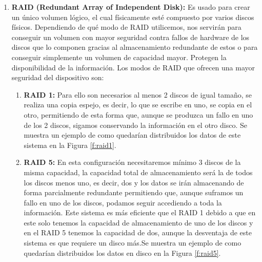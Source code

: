 \begin{enumerate}
\item {\bfseries RAID (Redundant Array of Independent Disk):}
Es usado para crear un único volumen lógico, el cual físicamente esté compuesto por varios discos físicos. Dependiendo de qué modo de RAID utilicemos, nos servirán para conseguir un volumen con mayor seguridad contra fallos de hardware de los discos que lo componen gracias al almacenamiento redundante de estos o para conseguir simplemente un volumen de capacidad mayor. Protegen la disponibilidad de la información.  Los modos de RAID que ofrecen una mayor seguridad del dispositivo son:
\begin{enumerate}
\item {\bfseries RAID 1:}
Para ello son necesarios al menos 2 discos de igual tamaño, se realiza una copia espejo, es decir, lo que se escribe en uno, se copia en el otro, permitiendo de esta forma que, aunque se produzca un fallo en uno de los 2 discos, sigamos conservando la información en el otro disco. Se muestra un ejemplo de como quedarían distribuidos los datos de este sistema en la Figura \ref{f:raid1}.
\item {\bfseries RAID 5:}
En esta configuración necesitaremos mínimo 3 discos de la misma capacidad, la capacidad total de almacenamiento será la de todos los discos menos uno, es decir, dos y los datos se irán almacenando de forma parcialmente redundante permitiendo que, aunque suframos un fallo en uno de los discos, podamos seguir accediendo a toda la información. Este sistema es más eficiente que el RAID 1 debido a que en este solo tenemos la capacidad de almacenamiento de uno de los discos y en el RAID 5 tenemos la capacidad de dos, aunque la desventaja de este sistema es que requiere un disco más.Se muestra un ejemplo de como quedarían distribuidos los datos en disco en la Figura \ref{f:raid5}.
\end{enumerate}


\end{enumerate}

